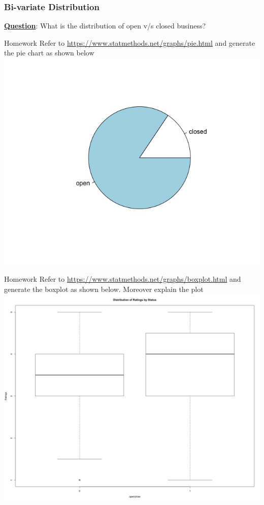 \newpage
\subsubsection{Bi-variate Distribution}
\noindent \textbf{\underline{Question}}: What is the distribution of open v/s closed business? 
\begin{knitrout}
\color{fgcolor}\begin{kframe}
\begin{alltt}
\hlopt{$}
\end{alltt}
\end{kframe}
\end{knitrout}

\begin{DIY}{Homework}
\noindent Refer to \textcolor{cyan}{\url{https://www.statmethods.net/graphs/pie.html}} and generate the pie chart as shown below
\includegraphics[width=9 cm]{./viz/ext/pieChartBusinessStatus.jpeg}
\end{DIY}


\begin{DIY}{Homework}
\noindent Refer to \textcolor{cyan}{\url{https://www.statmethods.net/graphs/boxplot.html}} and generate the boxplot as shown below. Moreover explain the plot
\includegraphics[width=12 cm]{./viz/ext/BoxPlot_Ratings_OpenStatus.jpeg}
\end{DIY}

